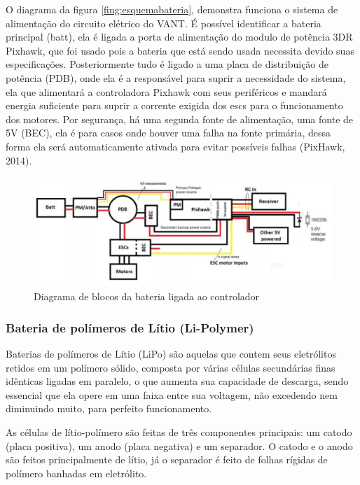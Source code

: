 O diagrama da figura \ref{fing:esquemabateria}, demonstra funciona o sistema de alimentação do circuito elétrico do VANT. É possível identificar a bateria principal (batt), ela é ligada a porta de alimentação do modulo de potência 3DR Pixhawk, que foi usado pois a bateria que está sendo usada necessita devido suas especificações. Posteriormente tudo é ligado a uma placa de distribuição de potência (PDB), onde ela é a responsável para suprir a necessidade do sistema, ela que alimentará a controladora Pixhawk com seus periféricos e mandará energia suficiente para suprir a corrente exigida dos escs para o funcionamento dos motores. Por segurança, há uma segunda fonte de alimentação, uma fonte de 5V (BEC), ela é para casos onde houver uma falha na fonte primária, dessa forma ela será automaticamente ativada para evitar possíveis falhas (PixHawk, 2014).

\begin{figure}[h!]
    \centering
	\includegraphics[keepaspectratio=true,scale=0.4]{figuras/esquemabateria.eps}
    \caption{Diagrama de blocos da bateria ligada ao controlador}
    \label{fig:esquemabateria}
\end{figure}


\subsubsection{Bateria de polímeros de Lítio (Li-Polymer)}

Baterias de polímeros de Lítio (LiPo) são aquelas que contem seus eletrólitos retidos em um polímero sólido, 
composta por várias células secundárias finas idênticas ligadas em paralelo, o que aumenta sua capacidade de 
descarga, sendo essencial que ela opere em uma faixa entre sua voltagem, não excedendo nem diminuindo muito, para perfeito funcionamento. \cite{gibbs}

As células de lítio-polímero são feitas de três componentes principais: um catodo (placa positiva), um anodo 
(placa negativa) e um separador. O catodo e o anodo são feitos principalmente de lítio, já o separador é feito 
de folhas rígidas de polímero banhadas em eletrólito. \cite{gibbs}

